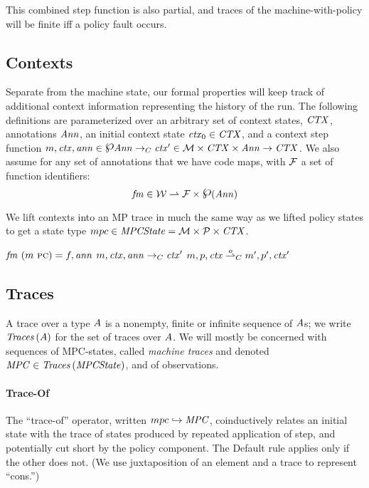 \documentclass[acmsmall,review,anonymous]{acmart}\settopmatter{printfolios=true,printccs=false,printacmref=false}
\newcommand{\powerset}{\raisebox{.15\baselineskip}{\Large\ensuremath{\wp}}}
\begin{document}
This combined step function is also partial, and traces of the machine-with-policy
will be finite iff a policy fault occurs.

\subsection{Contexts}

Separate from the machine state, our formal properties will keep track of additional context
information representing the history of the run. The following definitions are parameterized
over an arbitrary set of context states, \(\CONTEXTS\), annotations \(\ANNS\),
an initial context state \(\context_0 \in \CONTEXTS\), and a context step function
\(\mach, \context, \ann \in \powerset \ANNS \constep \context' \in \MACHS \times \CONTEXTS
\times \ANNS \rightarrow \CONTEXTS\). We also assume for any set of annotations that we have
code maps, with \(\FUNIDS\) a set of function identifiers:
\[\codemap \in \WORDS \rightharpoonup \FUNIDS \times \powerset(\ANNS)\]

We lift contexts into an MP trace in much the same way as we lifted policy states to get
a state type \(\mpcstatename \in \MPCS = \MACHS \times \POLS \times \CONTEXTS\).

              {\(\codemap ~ (\mach ~ \PCname) = \funid, \ann\)}
              {\(\mach, \context, \ann \constep \context'\)}
              {\(\mpcstate{\mach}{\pol}{\context} \stepstocon[\obs]
                \mpcstate{\mach'}{\pol'}{\context'}\)}

\subsection{Traces}
\label{sec:traces}

A trace over a type \(\TRACEELEMS\) is a nonempty, finite or infinite sequence of
\(\TRACEELEMS\)s; we write \(\TRACE{\TRACEELEMS}\) for the set of traces over
\(\TRACEELEMS\). We will mostly be concerned with sequences of MPC-states,
called \emph{machine traces} and denoted \(\MPCT \in \TRACE{\MPCS}\), and of observations.

\paragraph*{Trace-Of}

The ``trace-of'' operator, written \(\mpcstatename \hookrightarrow \MPCT\),
coinductively relates an initial state with the trace of states
produced by repeated application of step, and potentially cut short by
the policy component. The {\sc Default} rule applies only if the other does not.
(We use juxtaposition of an element and a trace to represent ``cons.'')
\end{document}
